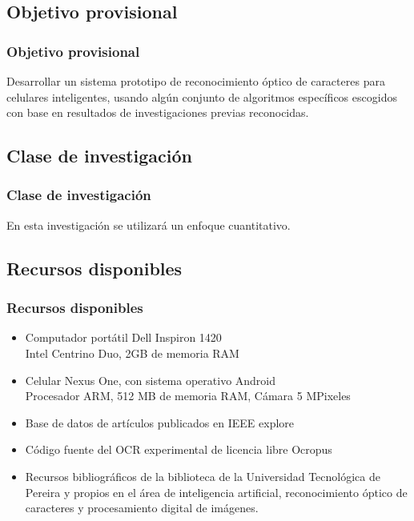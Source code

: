\documentclass{beamer}
\begin{document}
	\subsection{Objetivo provisional}
	\begin{frame}
	\frametitle{Objetivo provisional}
	Desarrollar un sistema prototipo de reconocimiento óptico de caracteres para celulares inteligentes, usando algún conjunto de algoritmos específicos escogidos con base en resultados de investigaciones previas reconocidas.
	\end{frame}
	
	\subsection{Clase de investigación}
	\begin{frame}
	\frametitle{Clase de investigación}
	En esta investigación se utilizará un enfoque cuantitativo.
	\end{frame}
	
	\subsection{Recursos disponibles}
	\begin{frame}
	\frametitle{Recursos disponibles}
	\begin{itemize}
		\item Computador portátil Dell Inspiron 1420\\
			Intel Centrino Duo, 2GB de memoria RAM
		\item Celular Nexus One, con sistema operativo Android\\
			Procesador ARM, 512 MB de memoria RAM, Cámara 5 MPixeles
		\item Base de datos de artículos publicados en IEEE explore
		\item Código fuente del OCR experimental de licencia libre Ocropus
	    \item Recursos bibliográficos de la biblioteca de la Universidad Tecnológica de Pereira y propios en el área de inteligencia artificial, reconocimiento óptico de caracteres y procesamiento digital de imágenes.
	\end{itemize}
	\end{frame}
	


\nocite{*}
\end{document}

